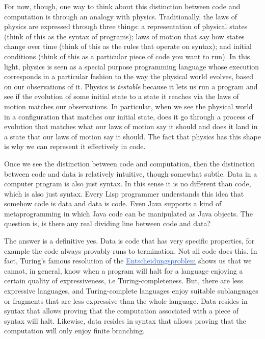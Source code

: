 \vspace{1\baselineskip}
For now, though, one way to think about this distinction between code and computation is through an analogy with physics. Traditionally, the laws of physics are expressed through three things: a representation of physical states (think of this as the syntax of programs); laws of motion that say how states change over time (think of this as the rules that operate on syntax); and initial conditions (think of this as a particular piece of code you want to run). In this light, physics is seen as a special purpose programming language whose execution corresponds in a particular fashion to the way the physical world evolves, based on our observations of it. Physics is \textit{testable} because it lets us run a program and see if the evolution of some initial state to a state it reaches via the laws of motion matches our observations. In particular, when we see the physical world in a configuration that matches our initial state, does it go through a process of evolution that matches what our laws of motion say it should and does it land in a state that our laws of motion say it should. The fact that physics has this shape is why we can represent it effectively in code.

\vspace{1\baselineskip}
Once we see the distinction between code and computation, then the distinction between code and data is relatively intuitive, though somewhat subtle. Data in a computer program is also just syntax. In this sense it is no different than code, which is also just syntax. Every Lisp programmer understands this idea that somehow code is data and data is code. Even Java supports a kind of metaprogramming in which Java code can be manipulated as Java objects. The question is, is there any real dividing line between code and data? 

\vspace{1\baselineskip}
The answer is a definitive yes. Data is code that has very specific properties, for example the code always provably runs to termination. Not all code does this. In fact, Turing’s famous resolution of the \href{https://en.wikipedia.org/wiki/Entscheidungsproblem}{\uline{\textcolor[HTML]{1155CC}{Entscheidungsproblem}}} shows us that we cannot, in general, know when a program will halt for a language enjoying a certain quality of expressiveness, i.e Turing-completeness. But, there are less expressive languages, and Turing-complete languages enjoy suitable sublanguages or fragments that are less expressive than the whole language. Data resides in syntax that allows proving that the computation associated with a piece of syntax will halt. Likewise, data resides in syntax that allows proving that the computation will only enjoy finite branching. 

